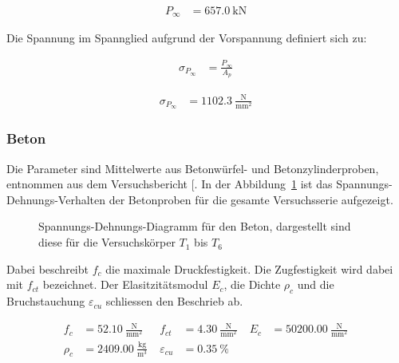 \documentclass[
  11pt,
  letterpaper,
]{scrreprt}
\begin{document}
$$
\begin{aligned}
P_{\infty} &= 657.0\ \mathrm{kN} \;
\end{aligned}
$$

Die Spannung im Spannglied aufgrund der Vorspannung definiert sich zu:

$$
\begin{aligned}
\sigma_{P_{\infty}} &= \frac{ P_{\infty} }{ A_{p} } \; 
\end{aligned}
$$

$$
\begin{aligned}
\sigma_{P_{\infty}} &= 1102.3\ \frac{\mathrm{N}}{\mathrm{mm}^{2}} \;
\end{aligned}
$$

\subsubsection{Beton}\label{beton}

Die Parameter sind Mittelwerte aus Betonwürfel- und Betonzylinderproben,
entnommen aus dem Versuchsbericht
{[}\citeproc{ref-sigrist_versuche_1993}{5}{]}. In der
Abbildung~\ref{fig-sigma_eps_beton} ist das Spannungs-Dehnungs-Verhalten
der Betonproben für die gesamte Versuchsserie aufgezeigt.

\begin{figure}[H]


\caption{\label{fig-sigma_eps_beton}Spannungs-Dehnungs-Diagramm für den
Beton, dargestellt sind diese für die Versuchskörper \(T_1\) bis
\(T_6\)}

\end{figure}%

Dabei beschreibt \(f_c\) die maximale Druckfestigkeit. Die Zugfestigkeit
wird dabei mit \(f_{ct}\) bezeichnet. Der Elasitzitätsmodul \(E_c\), die
Dichte \(\rho_c\) und die Bruchstauchung \(\varepsilon_{cu}\) schliessen
den Beschrieb ab.

$$
\begin{aligned}
f_{c} &= 52.10\ \frac{\mathrm{N}}{\mathrm{mm}^{2}} \; 
 &f_{ct} &= 4.30\ \frac{\mathrm{N}}{\mathrm{mm}^{2}} \; 
 &E_{c} &= 50200.00\ \frac{\mathrm{N}}{\mathrm{mm}^{2}} \; 
\\[10pt]
 \rho_{c} &= 2409.00\ \frac{\mathrm{kg}}{\mathrm{m}^{3}} \; 
 &\varepsilon_{cu} &= 0.35\ \mathrm{\%} \;
\end{aligned}
$$
\end{document}
